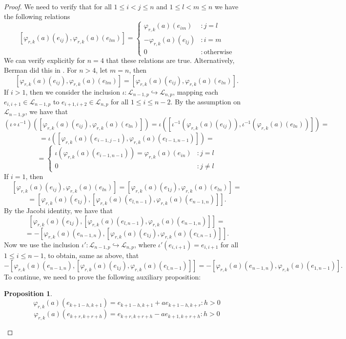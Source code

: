 \documentclass{article}
\newtheorem{proposition2}[theorem2]{Proposition}
\begin{document}
\begin{proof}
We need to verify that for all $1\leq{i<j}\leq{n}$ and $1\leq{l<m}\leq{n}$ we have the following relations \[
    [\varphi_{r,k}(a)(e_{ij}),\varphi_{r,k}(a)(e_{lm})]=\begin{cases}
    \varphi_{r,k}(a)(e_{im}) & : j=l\\
        -\varphi_{r,k}(a)(e_{lj}) & : i=m\\
        0 & : \mathrm{otherwise}
    \end{cases}
\]
We can verify explicitly for $n=4$ that these relations are true. Alternatively, Berman did this in \cite[\S{3.3.7}]{BermanThesis}. For $n>4$, let $m=n$, then \[[\varphi_{r,k}(a)(e_{ij}),\varphi_{r,k}(a)(e_{lm})]=[\varphi_{r,k}(a)(e_{ij}),\varphi_{r,k}(a)(e_{ln})].\]
If $i>1$, then we consider the inclusion $\iota:\mathcal{L}_{n-1,p}\hookrightarrow\mathcal{L}_{n,p}$, mapping each $e_{i,i+1}\in\mathcal{L}_{n-1,p}$ to $e_{i+1,i+2}\in\mathcal{L}_{n,p}$ for all $1\leq{i}\leq{n-2}$. By the assumption on $\mathcal{L}_{n-1,p}$, we have that \[
(\iota\circ\iota^{-1})([\varphi_{r,k}(a)(e_{ij}),\varphi_{r,k}(a)(e_{ln})])=\iota([\iota^{-1}(\varphi_{r,k}(a)(e_{ij})),\iota^{-1}(\varphi_{r,k}(a)(e_{ln}))])=\]\[=\iota([\varphi_{r,k}(a)(e_{i-1,j-1}),\varphi_{r,k}(a)(e_{l-1,n-1})])=\]\[=\begin{cases}
\iota(\varphi_{r,k}(a)(e_{i-1,n-1}))=\varphi_{r,k}(a)(e_{in}) & : j=l\\
        0 & : j\neq{l}
    \end{cases}
\]
If $i=1$, then \[[\varphi_{r,k}(a)(e_{ij}),\varphi_{r,k}(a)(e_{ln})]=[\varphi_{r,k}(a)(e_{1j}),\varphi_{r,k}(a)(e_{ln})]=\]\[=[\varphi_{r,k}(a)(e_{1j}),[\varphi_{r,k}(a)(e_{l,n-1}),\varphi_{r,k}(a)(e_{n-1,n})]].\]
By the Jacobi identity, we have that \[[\varphi_{r,k}(a)(e_{1j}),[\varphi_{r,k}(a)(e_{l,n-1}),\varphi_{r,k}(a)(e_{n-1,n})]]=\]\[=-[\varphi_{r,k}(a)(e_{n-1,n}),[\varphi_{r,k}(a)(e_{1j}),\varphi_{r,k}(a)(e_{l,n-1})]].\]
Now we use the inclusion $\iota':\mathcal{L}_{n-1,p}\hookrightarrow\mathcal{L}_{n,p}$, where $\iota'(e_{i,i+1})=e_{i,i+1}$ for all $1\leq{i}\leq{n-1}$, to obtain, same as above, that \[-[\varphi_{r,k}(a)(e_{n-1,n}),[\varphi_{r,k}(a)(e_{1j}),\varphi_{r,k}(a)(e_{l,n-1})]]=-[\varphi_{r,k}(a)(e_{n-1,n}),\varphi_{r,k}(a)(e_{1,n-1})].\]
To continue, we need to prove the following auxiliary proposition:
\begin{proposition2}
\label{phi.r.k.general.element}
\[\varphi_{r,k}(a)(e_{k+1-h,k+1})=e_{k+1-h,k+1}+ae_{k+1-h,k+r} : h>0\]
\[\varphi_{r,k}(a)(e_{k+r,k+r+h})=e_{k+r,k+r+h}-ae_{k+1,k+r+h} : h>0\]

\end{proposition2}
\end{proof}
\end{document}
